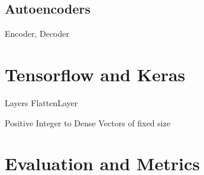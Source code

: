 \subsection{Autoencoders}
\label{subsec:autoencoder}
Encoder, Decoder

\section{Tensorflow and Keras}
\label{sec:tensorflow-keras}
Layers
FlattenLayer

Positive Integer to Dense Vectors of fixed size

\section{Evaluation and Metrics}
\label{sec:evaluation-metrics}

